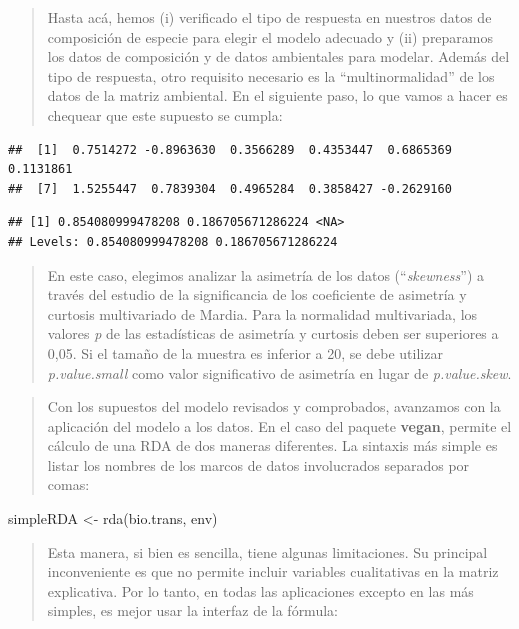 \documentclass[
]{book}
\newenvironment{Shaded}{\begin{snugshade}}{\end{snugshade}}
\newcommand{\FunctionTok}[1]{\textcolor[rgb]{0.00,0.00,0.00}{#1}}
\newcommand{\NormalTok}[1]{#1}
\newcommand{\OtherTok}[1]{\textcolor[rgb]{0.56,0.35,0.01}{#1}}
\begin{document}
\begin{quote}
Hasta acá, hemos (i) verificado el tipo de respuesta en nuestros datos de composición de especie para elegir el modelo adecuado y (ii) preparamos los datos de composición y de datos ambientales para modelar.
Además del tipo de respuesta, otro requisito necesario es la ``multinormalidad'' de los datos de la matriz ambiental. En el siguiente paso, lo que vamos a hacer es chequear que este supuesto se cumpla:
\end{quote}

\begin{verbatim}
##  [1]  0.7514272 -0.8963630  0.3566289  0.4353447  0.6865369  0.1131861
##  [7]  1.5255447  0.7839304  0.4965284  0.3858427 -0.2629160
\end{verbatim}

\begin{verbatim}
## [1] 0.854080999478208 0.186705671286224 <NA>             
## Levels: 0.854080999478208 0.186705671286224
\end{verbatim}

\begin{quote}
En este caso, elegimos analizar la asimetría de los datos (``\emph{skewness}'') a través del estudio de la significancia de los coeficiente de asimetría y curtosis multivariado de Mardia. Para la normalidad multivariada, los valores \emph{p} de las estadísticas de asimetría y curtosis deben ser superiores a 0,05. Si el tamaño de la muestra es inferior a 20, se debe utilizar \emph{p.value.small} como valor significativo de asimetría en lugar de \emph{p.value.skew}.
\end{quote}

\begin{quote}
Con los supuestos del modelo revisados y comprobados, avanzamos con la aplicación del modelo a los datos. En el caso del paquete \textbf{vegan}, permite el cálculo de una RDA de dos maneras diferentes. La sintaxis más simple es listar los nombres de los marcos de datos involucrados separados por comas:
\end{quote}

\begin{Shaded}
\begin{Highlighting}[]
\NormalTok{simpleRDA }\OtherTok{\textless{}{-}} \FunctionTok{rda}\NormalTok{(bio.trans, env)}
\end{Highlighting}
\end{Shaded}

\begin{quote}
Esta manera, si bien es sencilla, tiene algunas limitaciones. Su principal inconveniente es que no permite incluir variables cualitativas en la matriz explicativa. Por lo tanto, en todas las aplicaciones excepto en las más simples, es mejor usar la interfaz de la fórmula:
\end{quote}
\end{document}
